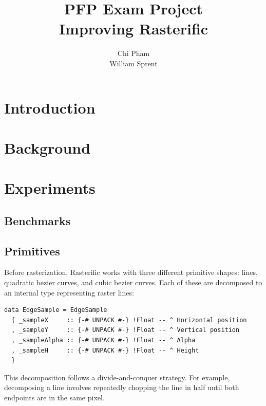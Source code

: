 \documentclass[12pt, a4paper]{article}
\begin{document}
\author{Chi Pham\\William Sprent}
\title{PFP Exam Project\\Improving Rasterific}
\maketitle

\section{Introduction}

\section{Background}

\section{Experiments}


\subsection{Benchmarks}

\subsection{Primitives}
Before rasterization, Rasterific works with three different primitive shapes:
lines, quadratic bezier curves, and cubic bezier curves. Each of these are decomposed
to an internal type representing raster lines:
\begin{lstlisting}[caption={\texttt{EdgeSample} type -- represents a raster line.}]
data EdgeSample = EdgeSample
  { _sampleX     :: {-# UNPACK #-} !Float -- ^ Horizontal position
  , _sampleY     :: {-# UNPACK #-} !Float -- ^ Vertical position
  , _sampleAlpha :: {-# UNPACK #-} !Float -- ^ Alpha
  , _sampleH     :: {-# UNPACK #-} !Float -- ^ Height
  }
\end{lstlisting}
This decomposition follows a divide-and-conquer strategy. For example, decomposing a line
involves repeatedly chopping the line in half until both endpoints are in the same pixel.
\end{document}
